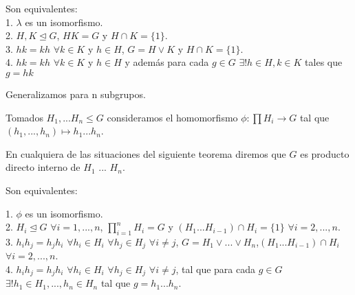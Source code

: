 \begin{theorem}
Son equivalentes:\\
1. $\lambda$ es un isomorfismo.\\
2. $H,K \trianglelefteq G$, $HK = G$ y $H \cap K = \{1\}$.\\
3. $hk = kh$ $\forall k \in K$ y $h \in H$, $G = H \lor K$ y $H \cap K = \{1\}$.\\
4. $hk = kh$ $\forall k \in K$ y $h \in H$ y además para cada $g \in G$ $\exists  ! h \in H, k \in K$ tales que $g = hk$
\end{theorem}

Generalizamos para n subgrupos.

Tomados $H_1,...H_n \le G$ consideramos el homomorfismo $\phi:\prod H_i \rightarrow G$ tal que $(h_1,...,h_n) \mapsto h_1...h_n$.

En cualquiera de las situaciones del siguiente teorema diremos que $G$ es producto directo interno de $H_1$ ... $H_n$.

\begin{theorem}
Son equivalentes:

1. $\phi$ es un isomorfismo.\\
2. $H_i \trianglelefteq G$ $\forall i = 1,...,n$, $\prod_{i=1}^{n} H_i = G$ y $(H_1...H_{i-1}) \cap H_i = \{1\}$ $\forall i = 2,...,n$.\\
3. $h_i h_j = h_j h_i$ $\forall h_i \in H_i$ $\forall h_j \in H_j$ $\forall i \neq j$, $G = H_1 \lor ... \lor H_n$,$(H_1...H_{i-1})\cap H_i$ $\forall i=2,...,n$.\\
4. $h_ih_j = h_jh_i$ $\forall h_i \in H_i$ $\forall h_j \in H_j$ $\forall i \neq j$, tal que para cada $g \in G$ $\exists ! h_1 \in H_1,...,h_n \in H_n$ tal que $g = h_1...h_n$.
\end{theorem}



